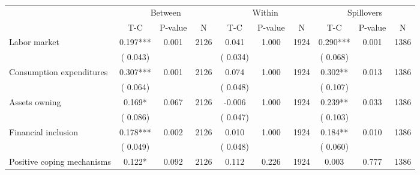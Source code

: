 
\begin{tabular}{l*{9}{c}}\hline&\multicolumn{3}{c}{Between}&\multicolumn{3}{c}{Within}&\multicolumn{3}{c}{Spillovers} \\ \cmidrule(r){2-4}\cmidrule(l){5-7}\cmidrule(l){8-10} & {T-C} & {P-value} & {N} & {T-C} & {P-value} & {N}  & {T-C} & {P-value} & {N}  \\ \midrule
 Labor market                 &              0.197***          &        0.001 & 2126          &              0.041          &        1.000 & 1924          &        0.290*** &        0.001 & 1386                 \\ 
                               &        (       0.043) & &                                                                 &       (       0.034) & &                                                          &       (       0.068)      & &     \\ 
 Consumption expenditures                 &              0.307***          &        0.001 & 2126          &              0.074 &        1.000 & 1924                   &        0.302** &        0.013 & 1386                 \\ 
                               &        (       0.064) & &                                                                 &       (       0.048) & &                                                          &       (       0.107) & &  \\ 
 Assets owning                 &              0.169*          &        0.067 & 2126          &             -0.006 &        1.000 & 1924                   &        0.239** &        0.033 & 1386                 \\ 
                               &        (       0.086) & &                                                                 &       (       0.047) & &                                                          & (       0.103)                                    \\ 
 Financial inclusion                 &              0.178***          &        0.002 & 2126          &              0.010 &        1.000 & 1924                   &        0.184** &        0.010 & 1386                 \\ 
                               &        (       0.049) & &                                                                 &       (       0.048) & &                                                          &       (       0.060) & &   \\ 
 Positive coping mechanisms                 &              0.122*          &        0.092 & 2126          &              0.112 &        0.226 & 1924                   &        0.003 &        0.777 & 1386                 \\ 

\end{tabular}
